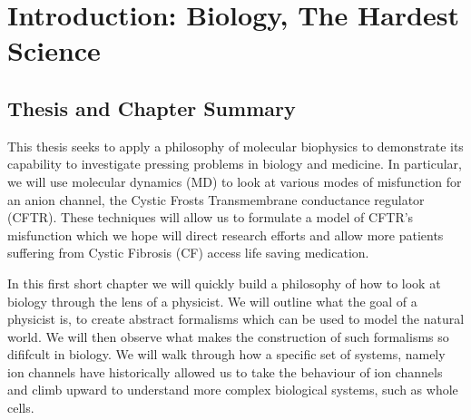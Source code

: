 \chapter{Introduction: Biology, The Hardest Science}
\label{chap:intro}
 {}
\vspace
\section{Thesis and Chapter Summary}

This thesis seeks to apply a philosophy of molecular biophysics to demonstrate its capability to investigate pressing problems in biology and medicine. In particular, we will use molecular dynamics (MD) to look at various modes of misfunction for an anion channel, the Cystic Frosts Transmembrane conductance regulator (CFTR). These techniques will allow us to formulate a model of CFTR's misfunction which we hope will direct research efforts and allow more patients suffering from Cystic Fibrosis (CF) access life saving medication. 

In this first short chapter we will quickly build a philosophy of how to look at biology through the lens of a physicist. We will outline what the goal of a physicist is, to create abstract formalisms which can be used to model the natural world. We will then observe what makes the construction of such formalisms so dififcult in biology. We will walk through how a specific set of systems, namely ion channels have historically allowed us to take the behaviour of ion channels and climb upward to understand more complex biological systems, such as whole cells. 

